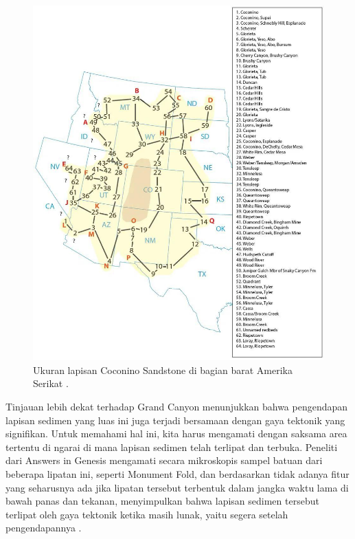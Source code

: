 \documentclass[10pt,twocolumn,letterpaper]{article}
\begin{document}
\begin{figure}[t]
\begin{center}
   \includegraphics[width=1\linewidth]{coconino.jpg}
\end{center}
   \caption{Ukuran lapisan Coconino Sandstone di bagian barat Amerika Serikat \cite{21}.}
\label{fig:3}
\label{fig:onecol}
\end{figure}

Tinjauan lebih dekat terhadap Grand Canyon menunjukkan bahwa pengendapan lapisan sedimen yang luas ini juga terjadi bersamaan dengan gaya tektonik yang signifikan. Untuk memahami hal ini, kita harus mengamati dengan saksama area tertentu di ngarai di mana lapisan sedimen telah terlipat dan terbuka. Peneliti dari Answers in Genesis \cite{42} mengamati secara mikroskopis sampel batuan dari beberapa lipatan ini, seperti Monument Fold, dan berdasarkan tidak adanya fitur yang seharusnya ada jika lipatan tersebut terbentuk dalam jangka waktu lama di bawah panas dan tekanan, menyimpulkan bahwa lapisan sedimen tersebut terlipat oleh gaya tektonik ketika masih lunak, yaitu segera setelah pengendapannya \cite{43}.
\end{document}

